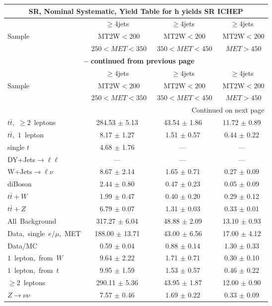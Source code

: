 \documentclass{article}
\begin{document}
\begin{longtable}{|l|c|c|c|} 
 
\multicolumn{4}{c}{ SR, Nominal Systematic, Yield Table for h yields SR ICHEP }\\* \hline 
  & $\ge$4jets  & $\ge$4jets  & $\ge$4jets \\* 
Sample  & ~MT2W$<200$  & ~MT2W$<200$  & ~MT2W$<200$ \\* 
  & ~$250<MET<350$  & ~$350<MET<450$  & ~$MET>450$ \\* 
\hline \hline 
\endfirsthead 
 
\multicolumn{4}{c}{{\bfseries \tablename\ \thetable{} -- continued from previous page}}\\* \hline 
  & $\ge$4jets  & $\ge$4jets  & $\ge$4jets \\* 
Sample  & ~MT2W$<200$  & ~MT2W$<200$  & ~MT2W$<200$ \\* 
  & ~$250<MET<350$  & ~$350<MET<450$  & ~$MET>450$ \\* 
\hline \hline 
\endhead 
 
\multicolumn{4}{|r|}{{Continued on next page}}\\* \hline 
\endfoot 
 
 
\endlastfoot 
 
$t\bar{t}$,~$\ge2$~leptons & 284.53 $\pm$ 5.13  & 43.54 $\pm$ 1.86  & 11.72 $\pm$ 0.89 \\* 
$t\bar{t}$,~$1$~lepton & 8.17 $\pm$ 1.27  & 1.51 $\pm$ 0.57  & 0.44 $\pm$ 0.22 \\* 
single $t$  & 4.68 $\pm$ 1.76  & ---  & --- \\* 
DY+Jets$\rightarrow\ell\ell$  & ---  & ---  & --- \\* 
W+Jets$\rightarrow\ell\nu$  & 8.67 $\pm$ 2.14  & 1.65 $\pm$ 0.71  & 0.27 $\pm$ 0.09 \\* 
diBoson  & 2.44 $\pm$ 0.80  & 0.47 $\pm$ 0.23  & 0.05 $\pm$ 0.09 \\* 
$t\bar{t}+W$  & 1.99 $\pm$ 0.47  & 0.40 $\pm$ 0.20  & 0.29 $\pm$ 0.12 \\* 
$t\bar{t}+Z$  & 6.79 $\pm$ 0.07  & 1.31 $\pm$ 0.03  & 0.33 $\pm$ 0.01 \\* 
\hline \hline 
All~Background  & 317.27 $\pm$ 6.04  & 48.88 $\pm$ 2.09  & 13.10 $\pm$ 0.93 \\* 
Data,~single~$e/\mu$,~MET  & 188.00 $\pm$ 13.71  & 43.00 $\pm$ 6.56  & 17.00 $\pm$ 4.12 \\* 
Data/MC  & 0.59 $\pm$ 0.04  & 0.88 $\pm$ 0.14  & 1.30 $\pm$ 0.33 \\* 
\hline \hline 
$1$~lepton,~from~$W$  & 9.64 $\pm$ 2.22  & 1.71 $\pm$ 0.71  & 0.30 $\pm$ 0.10 \\* 
$1$~lepton,~from~$t$  & 9.95 $\pm$ 1.59  & 1.53 $\pm$ 0.57  & 0.46 $\pm$ 0.22 \\* 
$\ge2$~leptons  & 290.11 $\pm$ 5.36  & 43.95 $\pm$ 1.87  & 12.00 $\pm$ 0.90 \\* 
$Z\rightarrow\nu\nu$  & 7.57 $\pm$ 0.46  & 1.69 $\pm$ 0.22  & 0.33 $\pm$ 0.09 \\* 
\hline 
\end{longtable} 
\end{document}
